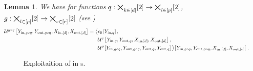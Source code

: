 \documentclass[aps,onecolumn,nofootinbib,pra]{article}
\newtheorem{lemma}{Lemma}
\begin{document}
    \begin{lemma}
        We have for functions $q:\bigtimes_{k\in[d]}[2]\rightarrow\bigtimes_{l\in[p]}[2]$, $g:\bigtimes_{l\in[p]}[2]\rightarrow\bigtimes_{s\in[r]}[2]$ (see )
        \begin{align*}
            \mathcal{U}^{g\circ q}\left[Y_{\mathrm{in},g\circ q},Y_{\mathrm{out},g\circ q},X_{\mathrm{in},[d]},X_{\mathrm{out},[d]}\right]
            = \big\langle 
                &\epsilon_{0}\left[Y_{\mathrm{in},q}\right],\\
                &\mathcal{U}^{q}\left[Y_{\mathrm{in},q},Y_{\mathrm{out},q},X_{\mathrm{in},[d]},X_{\mathrm{out},[d]}\right],\\
                &\mathcal{U}^{g}\left[Y_{\mathrm{in},g\circ q},Y_{\mathrm{out},g\circ q},Y_{\mathrm{out},q},Y_{\mathrm{out},q}\right]
             \big\rangle \big[ 
                Y_{\mathrm{in},g\circ q},Y_{\mathrm{out},g\circ q},X_{\mathrm{in},[d]},X_{\mathrm{out},[d]}
             \big] \, .
        \end{align*}
    \end{lemma}


    \begin{figure}
        \begin{center}
            
        \end{center}
        \caption{
            Exploitaition of \DecompositionSparsity{} in \computationCircuit{}s.
        }\label{fig:qcbencodingDecomposition}
    \end{figure}
\end{document}
